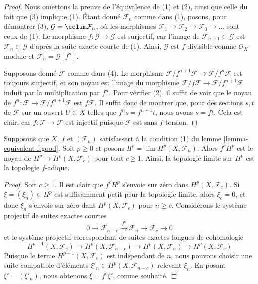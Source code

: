 \begin{proof}
Nous omettons la preuve de l'équivalence de (1) et (2), ainsi que celle du fait que (3) implique (1). Étant donné $\mathcal{F}_n$ comme dans (1), posons, pour démontrer (3),
$\mathcal{G} = \colim \mathcal{F}_n$, où les morphismes
$\mathcal{F}_1 \to \mathcal{F}_2 \to \mathcal{F}_3 \to \ldots$
sont ceux de (1). Le morphisme $f : \mathcal{G} \to \mathcal{G}$
est surjectif, car l'image de $\mathcal{F}_{n + 1} \subset \mathcal{G}$
est $\mathcal{F}_n \subset \mathcal{G}$ d'après la suite exacte courte de (1).
Ainsi, $\mathcal{G}$ est $f$-divisible comme $\mathcal{O}_X$-module et
$\mathcal{F}_n = \mathcal{G}[f^n]$.

\medskip\noindent
Supposons donné $\mathcal{F}$ comme dans (4). Le morphisme
$\mathcal{F}/f^{n + 1}\mathcal{F} \to \mathcal{F}/f^n\mathcal{F}$
est toujours surjectif, et son noyau est l'image du morphisme
$\mathcal{F}/f\mathcal{F} \to \mathcal{F}/f^{n + 1}\mathcal{F}$
induit par la multiplication par $f^n$. Pour vérifier (2), il suffit de voir que le noyau de
$f^n : \mathcal{F} \to \mathcal{F}/f^{n + 1}\mathcal{F}$
est $f\mathcal{F}$. Il suffit donc de montrer que, pour des sections
$s, t$ de $\mathcal{F}$ sur un ouvert $U \subset X$
telles que $f^ns = f^{n + 1}t$, nous avons $s = ft$. Cela est clair, car
$f : \mathcal{F} \to \mathcal{F}$ est injectif puisque $\mathcal{F}$
est sans $f$-torsion.
\end{proof}

\begin{lemma}

\label{lemma-topology-I-adic-f}
Supposons que $X$, $f$ et $(\mathcal{F}_n)$ satisfassent à la condition (1) du lemme \ref{lemma-equivalent-f-good}. Soit $p \geq 0$ et posons
$H^p = \lim H^p(X, \mathcal{F}_n)$. Alors $f^cH^p$ est le noyau de $H^p \to H^p(X, \mathcal{F}_c)$ pour tout
$c \geq 1$. Ainsi, la topologie limite sur $H^p$ est la topologie $f$-adique.
\end{lemma}

\begin{proof}

Soit $c \geq 1$. Il est clair que $f^c H^p$ s'envoie sur zéro dans
$H^p(X, \mathcal{F}_c)$. Si $\xi = (\xi_n) \in H^p$ est suffisamment petit pour la topologie limite, alors $\xi_c = 0$, et donc $\xi_n$
s'envoie sur zéro dans $H^p(X, \mathcal{F}_c)$ pour $n \geq c$. Considérons le système projectif de suites exactes courtes
$$
0 \to \mathcal{F}_{n - c} \xrightarrow{f^c} \mathcal{F}_n \to
\mathcal{F}_c \to 0
$$
et le système projectif correspondant de suites exactes longues de cohomologie
$$
H^{p - 1}(X, \mathcal{F}_c) \to
H^p(X, \mathcal{F}_{n - c}) \to
H^p(X, \mathcal{F}_n) \to
H^p(X, \mathcal{F}_c)
$$
Puisque le terme $H^{p - 1}(X, \mathcal{F}_c)$ est indépendant de
$n$, nous pouvons choisir une suite compatible d'éléments
$\xi'_n \in H^p(X, \mathcal{F}_{n - c})$
relevant $\xi_n$. En posant $\xi' = (\xi'_n)$, nous obtenons $\xi = f^c \xi'$,
comme souhaité.

\end{proof}

